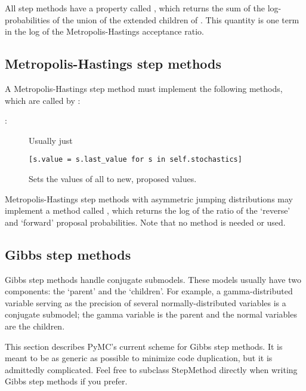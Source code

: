 All step methods have a property called , which returns the sum of the log-probabilities of the union of the extended children of . This quantity is one term in the log of the Metropolis-Hastings acceptance ratio.


\hypertarget{user-metro}{}
\subsection*{Metropolis-Hastings step methods} \label{user-metro}
A Metropolis-Hastings step method must implement the following methods, which are called by :
\begin{description}

   \item[:] Usually just
   \begin{verbatim}
[s.value = s.last_value for s in self.stochastics]
   \end{verbatim}
   \item[] Sets the values of all  to new, proposed values.
\end{description}
Metropolis-Hastings step methods with asymmetric jumping distributions may implement a method called , which returns the log of the ratio of the `reverse' and `forward' proposal probabilities. Note that no  method is needed or used.

\hypertarget{user-gibbs}{}
\subsection*{Gibbs step methods} \label{user-gibbs}

Gibbs step methods handle conjugate submodels. These models usually have two components: the `parent' and the `children'. For example, a gamma-distributed variable serving as the precision of several normally-distributed variables is a conjugate submodel; the gamma variable is the parent and the normal variables are the children. 

This section describes PyMC's current scheme for Gibbs step methods. It is meant to be as generic as possible to minimize code duplication, but it is admittedly complicated. Feel free to subclass StepMethod directly when writing Gibbs step methods if you prefer.

